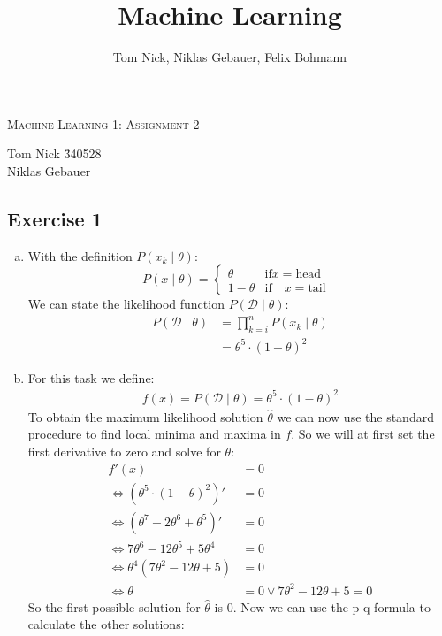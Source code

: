 \documentclass[10pt,a4paper]{article}
\author{Tom Nick, Niklas Gebauer, Felix Bohmann}
\title{Machine Learning}
\newcommand{\D}{\mathcal{D}}
\begin{document}
\begin{center}
\Large{\textsc{Machine Learning 1: Assignment 2}} \\
\end{center}

\begin{tabbing}
Tom Nick \hspace{0.9cm}\= 340528\\
Niklas Gebauer 
\end{tabbing}

\subsection*{Exercise 1}
\begin{enumerate}[(a)]
\item 
With the definition $P(x_k \mid \theta)$:
$$P(x \mid \theta) = \begin{cases} \theta &\text{if} x = \text{head}\quad \\ 1 - \theta &\text{if}\quad x = \text{tail} \end{cases}$$
We can state the likelihood function $P(\D \mid \theta)$:
\begin{align*}
	P(\D \mid \theta) &= \prod_{k = i}^{n} P(x_k \mid \theta) \\
	&= \theta^5 \cdot (1 - \theta)^2
\end{align*}
\item
For this task we define:
\begin{align*}
f(x) = P(\D \mid \theta) = \theta^5 \cdot (1 - \theta)^2
\end{align*}
To obtain the maximum likelihood solution $\hat{\theta}$ we can now use the standard procedure to find local minima and maxima in $f$. So we will at first set the first derivative to zero and solve for $\theta$:
\begin{align*}
f'(x) &= 0\\
\Leftrightarrow (\theta^5 \cdot (1 - \theta)^2)' &= 0\\
\Leftrightarrow (\theta^7 - 2\theta^6 + \theta^5)' &= 0\\
\Leftrightarrow 7\theta^6 - 12\theta^5 + 5\theta^4 &= 0\\
\Leftrightarrow \theta^4(7\theta^2-12\theta+5) &= 0\\
\Leftrightarrow \theta &= 0 \vee 7\theta^2-12\theta+5 = 0
\end{align*}
So the first possible solution for $\hat{\theta}$ is $0$. Now we can use the p-q-formula to calculate the other solutions:

\end{enumerate}
\end{document}
